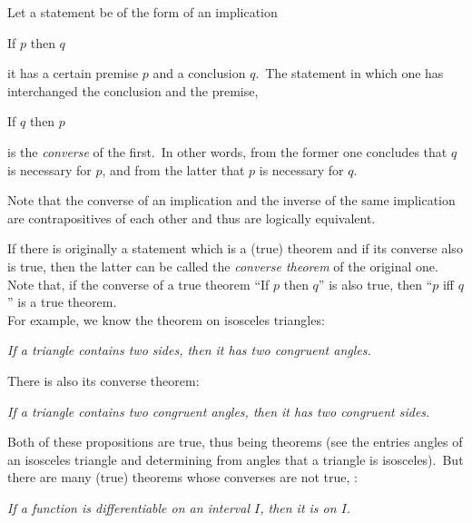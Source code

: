 \documentclass[12pt]{article}
\theoremstyle{definition}
\begin{document}

Let a statement be of the form of an implication

\begin{center}
If $p$ then $q$
\end{center}

 it has a certain premise $p$ and a conclusion $q$.\, The statement in which one has interchanged the conclusion and the premise,

\begin{center}
If $q$ then $p$
\end{center}

is the \emph{converse} of the first.\, In other words, from the former one concludes that $q$ is necessary for $p$, and from the latter that $p$ is necessary for $q$.

Note that the converse of an implication and the inverse of the same implication are contrapositives of each other and thus are logically equivalent.

If there is originally a statement which is a (true) theorem and if its converse also is true, then the latter can be called the \emph{converse theorem} of the original one.\, Note that, if the converse of a true theorem ``If $p$ then $q$'' is also true, then ``$p$ iff $q$'' is a true theorem. \\

For example, we know the theorem on isosceles triangles:

\emph{If a triangle contains two  sides, then it has two congruent angles.}

There is also its converse theorem:

\emph{If a triangle contains two congruent angles, then it has two congruent sides.}

Both of these propositions are true, thus being theorems (see the entries angles of an isosceles triangle and determining from angles that a triangle is isosceles).\, But there are many (true) theorems whose converses are not true, :

\emph{If a function is differentiable on an interval $I$, then it is  on $I$.}
\end{document}

